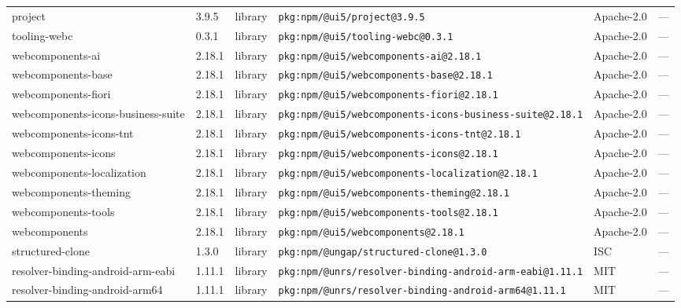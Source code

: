 \documentclass[11pt,a4paper]{article}
\begin{document}
\begin{longtable}{|p{4cm}|p{2cm}|p{1.6cm}|p{5cm}|p{1.5cm}|p{3.5cm}|}
\raggedright project & 3.9.5 & library & \small\texttt{pkg:npm/@ui5/project@3.9.5} & Apache-2.0 & \small — \\
\raggedright tooling-webc & 0.3.1 & library & \small\texttt{pkg:npm/@ui5/tooling-webc@0.3.1} & Apache-2.0 & \small — \\
\raggedright webcomponents-ai & 2.18.1 & library & \small\texttt{pkg:npm/@ui5/webcomponents-ai@2.18.1} & Apache-2.0 & \small — \\
\raggedright webcomponents-base & 2.18.1 & library & \small\texttt{pkg:npm/@ui5/webcomponents-base@2.18.1} & Apache-2.0 & \small — \\
\raggedright webcomponents-fiori & 2.18.1 & library & \small\texttt{pkg:npm/@ui5/webcomponents-fiori@2.18.1} & Apache-2.0 & \small — \\
\raggedright webcomponents-icons-business-suite & 2.18.1 & library & \small\texttt{pkg:npm/@ui5/webcomponents-icons-business-suite@2.18.1} & Apache-2.0 & \small — \\
\raggedright webcomponents-icons-tnt & 2.18.1 & library & \small\texttt{pkg:npm/@ui5/webcomponents-icons-tnt@2.18.1} & Apache-2.0 & \small — \\
\raggedright webcomponents-icons & 2.18.1 & library & \small\texttt{pkg:npm/@ui5/webcomponents-icons@2.18.1} & Apache-2.0 & \small — \\
\raggedright webcomponents-localization & 2.18.1 & library & \small\texttt{pkg:npm/@ui5/webcomponents-localization@2.18.1} & Apache-2.0 & \small — \\
\raggedright webcomponents-theming & 2.18.1 & library & \small\texttt{pkg:npm/@ui5/webcomponents-theming@2.18.1} & Apache-2.0 & \small — \\
\raggedright webcomponents-tools & 2.18.1 & library & \small\texttt{pkg:npm/@ui5/webcomponents-tools@2.18.1} & Apache-2.0 & \small — \\
\raggedright webcomponents & 2.18.1 & library & \small\texttt{pkg:npm/@ui5/webcomponents@2.18.1} & Apache-2.0 & \small — \\
\raggedright structured-clone & 1.3.0 & library & \small\texttt{pkg:npm/@ungap/structured-clone@1.3.0} & ISC & \small — \\
\raggedright resolver-binding-android-arm-eabi & 1.11.1 & library & \small\texttt{pkg:npm/@unrs/resolver-binding-android-arm-eabi@1.11.1} & MIT & \small — \\
\raggedright resolver-binding-android-arm64 & 1.11.1 & library & \small\texttt{pkg:npm/@unrs/resolver-binding-android-arm64@1.11.1} & MIT & \small — \\

\end{longtable}
\end{document}
